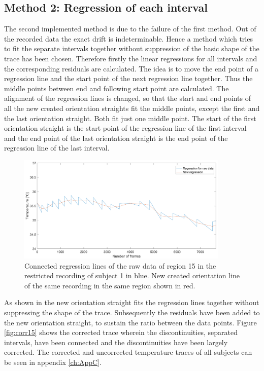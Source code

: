 \subsection{Method 2: Regression of each interval}

The second implemented method is due to the failure of the first method. Out of the recorded data the exact drift is indeterminable. Hence a method which tries to fit the separate intervals together without suppression of the basic shape of the trace has been chosen.
Therefore firstly the linear regressions for all intervals and the corresponding residuals are calculated.
The idea is to move the end point of a regression line and the start point of the next regression line together. Thus the middle points between end and following start point are calculated. The alignment of the regression lines is changed, so that the start and end points of all the new created orientation straights fit the middle points, except the first and the last orientation straight. Both fit just one middle point. The start of the first orientation straight is the start point of the regression line of the first interval and the end point of the last orientation straight is the end point of the regression line of the last interval.
\begin{figure}[H]
	\includegraphics[width=0.9\textwidth]{figures/reg15}
	\caption{Connected regression lines of the raw data of region 15 in the restricted recording of subject 1 in blue. New created orientation line of the same recording in the same region shown in red.}
	\label{fig:reg15}
\end{figure}
As shown in  the new orientation straight fits the regression lines together without suppressing the shape of the trace. Subsequently the residuals have been added to the new orientation straight, to sustain the ratio between the data points. Figure \ref{fig:corr15} shows the corrected trace wherein the discontinuities, separated intervals, have been connected and the discontinuities have been largely corrected. The corrected and uncorrected temperature traces of all subjects can be seen in appendix \ref{ch:AppC}.
